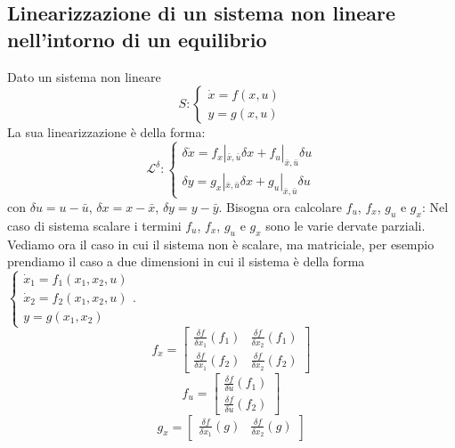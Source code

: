 \subsection{Linearizzazione di un sistema non lineare nell'intorno di un equilibrio}
Dato un sistema non lineare 
\[
    S: \begin{cases}
        \dot{x} = f(x, u)\\ y = g(x,u)
    \end{cases}
\]
La sua linearizzazione è della forma:
\[
    \mathcal{L}^\delta : \begin{cases}
        \delta \dot{x} = f_x |_{\bar{x},\bar{u}} \delta x + f_u|_{\bar{x},\bar{u}} \delta u\\
        \delta y = g_x|_{\bar{x},\bar{u}} \delta x + g_u |_{\bar{x},\bar{u}} \delta u
    \end{cases}
\]
con $ \delta u = u - \bar{u}$, $\delta x = x -\bar{x}$, $ \delta y = y - \bar{y}$.\newline
\newline
Bisogna ora calcolare $f_u$, $f_x$, $g_u$ e $g_x$:\newline
\newline
Nel caso di sistema scalare i termini $f_u$, $f_x$, $g_u$ e $g_x$ sono le varie dervate parziali.\newline
\newline
Vediamo ora il caso in cui il sistema non è scalare, ma matriciale, per esempio prendiamo il caso a due dimensioni in cui il sistema è della forma $\begin{cases}
    \dot{x}_1 = f_1(x_1, x_2, u)\\ 
    \dot{x}_2 = f_2(x_1,x_2, u)\\
    y = g(x_1,x_2)
\end{cases}$.
\[
    f_x=\left[\begin{matrix}
        \frac{\delta f}{\delta x_1} (f_1) & \frac{\delta f}{\delta x_2} (f_1)\\
        \frac{\delta f}{\delta x_1} (f_2) & \frac{\delta f}{\delta x_2} (f_2)
    \end{matrix}\right]
\]
\[
    f_u = \left[\begin{matrix}
        \frac{\delta f}{\delta u} (f_1)\\
        \frac{\delta f}{\delta u} (f_2)
    \end{matrix}\right]
\]
\[
    g_x = \left[\begin{matrix}
        \frac{\delta f}{\delta x_1} (g) & \frac{\delta f}{\delta x_2} (g)
    \end{matrix}\right]
\]
